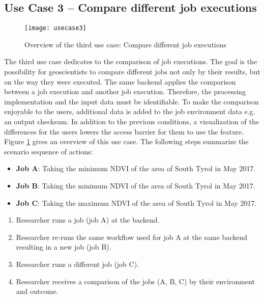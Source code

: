 \documentclass[draft,final]{vutinfth} %
\begin{document}
\subsection{Use Case 3 – Compare different job executions}\label{UseCase3}
\begin{figure}[h]
	\centering
	\texttt{[image: usecase3]}
	\caption{Overview of the third use case: Compare different job executions}
	\label{fig:usecase3} %
\end{figure}
The third use case dedicates to the comparison of job executions. The goal is the possibility for geoscientists to compare different jobs not only by their results, but on the way they were executed. The same backend applies the comparison between a job execution and another job execution. Therefore, the processing implementation and the input data must be identifiable. To make the comparison enjoyable to the users, additional data is added to the job environment data e.g. an output checksum. In addition to the previous conditions, a visualization of the differences for the users lowers the access barrier for them to use the feature. Figure \ref{fig:usecase3} gives an overview of this use case.
The following steps summarize the scenario sequence of actions: \\

\begin{itemize}
	\item \textbf{Job A}: Taking the minimum NDVI of the area of South Tyrol in May 2017. 
	\item \textbf{Job B}: Taking the minimum NDVI of the area of South Tyrol in May 2017.
	\item \textbf{Job C}: Taking the maximum NDVI of the area of South Tyrol in May 2017.
\end{itemize}

\begin{enumerate}
	\item Researcher runs a job (job A) at the backend.
	\item Researcher re-runs the same workflow used for job A at the same backend resulting in a new job (job B).
	\item Researcher runs a different job (job C).   
	\item Researcher receives a comparison of the jobs (A, B, C) by their environment and outcome.
\end{enumerate}
\end{document}
